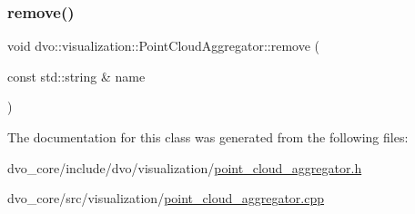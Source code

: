 \subsubsection{\texorpdfstring{remove()}{remove()}}
{\footnotesize\ttfamily void dvo\+::visualization\+::\+Point\+Cloud\+Aggregator\+::remove (\begin{DoxyParamCaption}\item[{const std\+::string \&}]{name }\end{DoxyParamCaption})}



The documentation for this class was generated from the following files\+:\begin{DoxyCompactItemize}
\item 
dvo\+\_\+core/include/dvo/visualization/\mbox{\hyperlink{point__cloud__aggregator_8h}{point\+\_\+cloud\+\_\+aggregator.\+h}}\item 
dvo\+\_\+core/src/visualization/\mbox{\hyperlink{point__cloud__aggregator_8cpp}{point\+\_\+cloud\+\_\+aggregator.\+cpp}}\end{DoxyCompactItemize}
